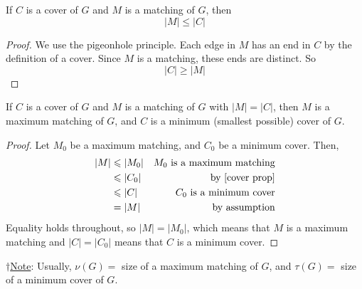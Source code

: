 \begin{thmbox}
    \begin{prop}\label{cover prop}
        If $ C $ is a cover of $ G $ and $ M $ is a matching of $ G $, then
        \[ |M|\leqslant |C| \]
    \end{prop}
\end{thmbox}
\begin{proof}
    We use the pigeonhole principle. Each edge in $ M $ has an end in $ C $ by the definition
    of a cover. Since $ M $ is a matching, these ends are distinct. So
    \[ |C|\geqslant |M| \]
\end{proof}

\begin{thmbox}
    \begin{prop}\label{equality cover}
        If $ C $ is a cover of $ G $ and $ M $ is a matching of $ G $ with $ |M|=|C| $,
        then $ M $ is a maximum matching of $ G $, and $ C $ is a minimum (smallest possible)
        cover of $ G $.
    \end{prop}
\end{thmbox}
\begin{proof}
    Let $ M_0 $ be a maximum matching, and $ C_0 $ be a minimum cover. Then,
    \begin{equation}
        \begin{aligned}
            |M| & \leqslant |M_0| & M_0\text{ is a maximum matching} \\
                & \leqslant |C_0| & \text{by \ref{cover prop}}       \\
                & \leqslant |C|   & C_0 \text{ is a minimum cover}   \\
                & =|M|            & \text{by assumption}
        \end{aligned}
    \end{equation}
    Equality holds throughout, so $ |M|=|M_0| $, which means that $ M $ is a maximum
    matching and $ |C|=|C_0| $ means that $ C $ is a minimum cover.
\end{proof}
$ \dagger $\underline{Note}: Usually, $ \nu(G) = $ size of a maximum matching of $ G $,
and $ \tau(G) = $ size of a minimum cover of $ G $.

